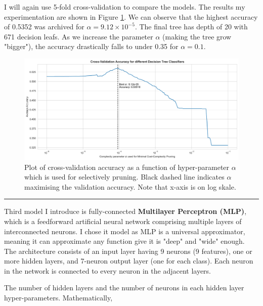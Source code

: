 \documentclass{assignment}
\begin{document}
\medskip


I will again use 5-fold cross-validation to compare the models. The results my experimentation are shown in Figure \ref{fig:Decision_Tree_classifier_hyperparameter_tuning_plot}. We can observe that the highest accuracy of 0.5352 was archived for $\alpha=9.12\times10^{-5}$. The final tree has depth of 20 with 671 decision leafs. As we increase the parameter $\alpha$ (making the tree grow "bigger"), the accuracy drastically falls to under 0.35 for $\alpha=0.1$. 
\bigskip
\bigskip





\begin{figure}[H]
\centering
\includegraphics[width=0.9\linewidth]{Decision_Tree_classifier_hyperparameter_tuning_plot.png}
\caption{\label{fig:Decision_Tree_classifier_hyperparameter_tuning_plot}Plot of cross-validation accuracy as a function of hyper-parameter $\alpha$ which is used for selectively pruning. Black dashed line indicates $\alpha$ maximising the validation accuracy. Note that x-axis is on log skale.}
\end{figure}

\newpage

\noindent\rule{16.5cm}{0.55pt}
\smallskip

Third model I introduce is fully-connected \textbf{Multilayer Perceptron (MLP)}, which is a feedforward artificial neural network comprising multiple layers of interconnected neurons. I chose it model as MLP is a universal approximator, meaning it can approximate any function give it is "deep" and "wide" enough. The architecture consists of an input layer having  9 neurons (9 features), one or more hidden layers, and 7-neuron output layer (one for each class). Each neuron in the network is connected to every neuron in the adjacent layers.

\smallskip


The number of hidden layers and the number of neurons in each hidden layer hyper-parameters. Mathematically,
\end{document}
